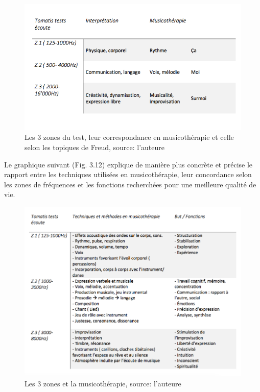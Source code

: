 \begin{figure}
	\centering
	\includegraphics[width=0.9\linewidth]{images/testinterpmusico}
	\caption[ L'interprétation des 3 zones et leur correspondance
	en musicothérapie]{Les 3 zones du
		test, leur correspondance en musicothérapie et celle selon les
		topiques de Freud, source: l'auteure}
	
	\label{graphiquecolonnetestmusico}
\end{figure}
 \clearpage
 Le graphique suivant (Fig. 3.12) explique de manière plus concrète et précise le 
 rapport entre les 
 techniques 
 utilisées en musicothérapie, leur concordance selon les zones de fréquences et les fonctions 
 recherchées pour 
 une meilleure qualité de vie.
\begin{figure}[tbh]
	\centering
	\includegraphics[width=0.9\linewidth]{images/testtechnmethbut}
	\caption[Zones du test avec la musicothérapie]{Les 3
		zones et la musicothérapie, source: l'auteure}
	
	\label{testbutetfonction}
\end{figure}


